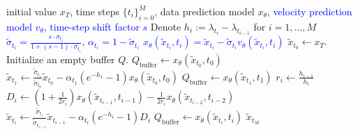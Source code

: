 \begin{algorithm}[htbp]
    \small
    \caption{Flow-DPM-Solver (Modified from DPM-Solver++)}
    \label{alg:flow_dpm_solver}
    \begin{algorithmic}[1]
        \Require initial value $x_T$, time steps $\{t_i\}_{i=0}^M$, data prediction model $x_\theta$, \textcolor{blue}{velocity prediction model $v_\theta$}, \textcolor{blue}{time-step shift factor $s$}
        \State Denote $h_i := \lambda_{t_i} - \lambda_{t_{i-1}}$ for $i = 1, \dots, M$
        \State \textcolor{blue}{$\tilde{\sigma}_{t_i} = \frac{s \cdot \sigma_{t_i}}{1 + (s - 1) \cdot \sigma_{t_i}}$}, \textcolor{blue}{$\alpha_{t_i} = 1 - \tilde{\sigma}_{t_i}$} 
        \State \textcolor{blue}{$x_\theta(\tilde{x}_{t_i}, t_i) = \tilde{x}_{t_i} - \tilde{\sigma}_{t_i} v_\theta(\tilde{x}_{t_i}, t_i)$} 
        \State $\tilde{x}_{t_0} \gets x_T$. Initialize an empty buffer $Q$.
        \State $Q_{\text{buffer}} \gets x_\theta(\tilde{x}_{t_0}, t_0)$
        \State $\tilde{x}_{t_1} \gets \frac{\tilde{\sigma}_{t_1}}{\tilde{\sigma}_{t_0}} \tilde{x}_{t_0} - \alpha_{t_1} \left( e^{-h_1} - 1 \right) x_\theta(\tilde{x}_{t_0}, t_0)$
        \State $Q_{\text{buffer}} \gets x_\theta(\tilde{x}_{t_1}, t_1)$
            \State $r_i \gets \frac{h_{i-1}}{h_i}$
            \State $D_i \gets \left( 1 + \frac{1}{2r_i} \right) x_\theta(\tilde{x}_{t_{i-1}}, t_{i-1}) - \frac{1}{2r_i} x_\theta(\tilde{x}_{t_{i-2}}, t_{i-2})$
            \State $\tilde{x}_{t_i} \gets \frac{\tilde{\sigma}_{t_i}}{\tilde{\sigma}_{t_{i-1}}} \tilde{x}_{t_{i-1}} - \alpha_{t_i} \left( e^{-h_i} - 1 \right) D_i$
                \State $Q_{\text{buffer}} \gets x_\theta(\tilde{x}_{t_i}, t_i)$
            \EndIf
        \EndFor
        \State \Return $\tilde{x}_{t_M}$
    \end{algorithmic}
\end{algorithm}

